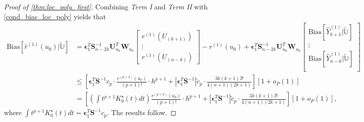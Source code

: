 \documentclass{uwstat572}
\theoremstyle{definition}
\renewcommand{\hat}{\widehat}
\renewcommand{\tilde}{\widetilde}
\theoremstyle{theorem}
\begin{document}
\begin{proof}[Proof of \autoref{thm:loc_poly_first}]
Combining \emph{Term I} and \emph{Term II} with \eqref{cond_bias_loc_poly} yields that
\begin{align*}
\mathrm{Bias}\left[\hat{r}^{(1)}(u_0) \big| \tilde{\mathbb{U}}\right] &= \bm{\epsilon}_1^T \bm{S}_{n-2k}^{-1} \bm{U}_{u_0}^T \bm{W}_{u_0} \begin{bmatrix}
		r^{(1)}(U_{(k+1)})\\
		\vdots\\
		r^{(1)}(U_{(n-k)})
	\end{bmatrix} -r^{(1)}(u_0) + \bm{\epsilon}_1^T \bm{S}_{n-2k}^{-1} \bm{U}_{u_0}^T \bm{W}_{u_0}\begin{bmatrix}
		\mathrm{Bias}\left[\hat{Y}_{k+1}^{(1)} \big|\tilde{\mathbb{U}}\right]\\
		\vdots\\
		\mathrm{Bias}\left[\hat{Y}_{n-k}^{(1)} \big|\tilde{\mathbb{U}}\right]\\
\end{bmatrix}\\
&\leq \left[\bm{\epsilon}_1^T \bm{S}^{-1}c_p\cdot \frac{r^{(p+2)}(u_0)}{(p+1)!} \cdot h^{p+1} + \left|\bm{\epsilon}_1^T \bm{S}^{-1} \right| \tilde{c}_p \cdot \frac{3k(k+1) \mathcal{B}}{4(n+1)(2k+1)}\right] \left[1+o_P(1)\right]\\
&= \left[\left(\int t^{p+1} K_0^{\star}(t) dt\right) \frac{r^{(p+2)}(u_0)}{(p+1)!} \cdot h^{p+1} + \left|\bm{\epsilon}_1^T \bm{S}^{-1}\right| \tilde{c}_p \cdot\frac{3k(k+1) \mathcal{B}}{4(n+1)(2k+1)}\right] \left[1+o_P(1)\right],
\end{align*}
where $\int t^{p+1} K_0^{\star}(t) dt= \bm{\epsilon}_1^T \bm{S}^{-1} c_p$. The results follow.
\end{proof}
\end{document}
